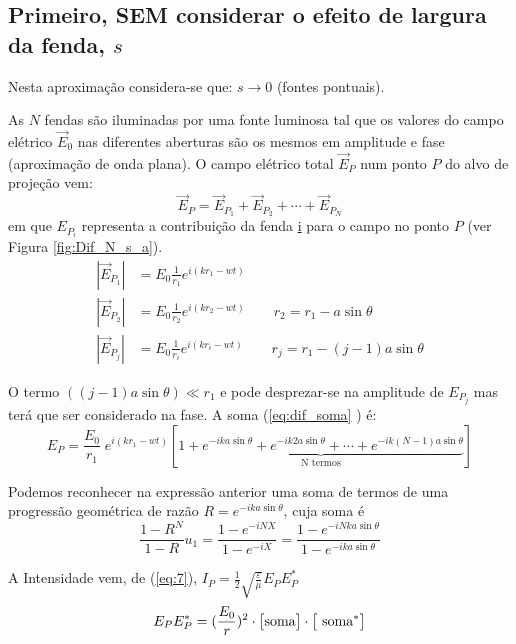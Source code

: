 \documentclass[a4paper,12pt]{article}
\begin{document}
\subsection{Primeiro, SEM considerar o efeito de largura da fenda, $s$}

Nesta aproximação considera-se que: $s\to 0$ (fontes pontuais).
 
As $N$ fendas são iluminadas por uma fonte luminosa tal que os valores do campo elétrico $\vec{E}_0$ nas diferentes aberturas são os mesmos em amplitude e fase (aproximação de onda plana). O campo elétrico total $\vec{E}_P$ num ponto $P$ do alvo de projeção vem:   
\begin{equation}
	\label{eq:dif_soma} \vec{E}_P = \vec{E}_{P_1} + \vec{E}_{P_2} +\cdots +\vec{E}_{P_N} 
\end{equation}
em que $E_{P_i}$ representa a contribuição da fenda \underline{i} para o campo no ponto $P$ (ver Figura \ref{fig:Dif_N_s_a}). 
\begin{align}
	\label{eq:38} |\vec{E}_{P_1}| &= E_0 \frac{1}{r_1} e^{i(k r_1 -wt)} \nonumber \\
	|\vec{E}_{P_2}| &= E_0 \frac{1}{r_2} e^{i(k r_2 -wt)} \qquad r_2 = r_1 - a \sin \theta \\
	|\vec{E}_{P_j}| &= E_0 \frac{1}{r_i} e^{i(k r_i -wt)}\qquad r_j = r_1 - (j-1) a \sin \theta \nonumber 
\end{align}

O termo $((j-1) a \sin \theta) \ll r_1$ e pode desprezar-se na amplitude de $E_{P_j}$ mas terá que ser considerado na fase. A soma (\ref{eq:dif_soma} ) é: 
\begin{equation}
	\label{eq:39} E_{P} = \frac{E_0}{r_1} \; e^{i(k r_1 -wt)} \left[ \underbrace{1 + e^{-i k a \sin \theta} + e^{-i k 2 a \sin \theta} + \cdots + e^{-i k (N-1) a \sin \theta}}_{\text{N termos} }\right]
\end{equation}

Podemos reconhecer na expressão anterior uma soma de termos de uma progressão geométrica de razão $R = e^{-i k a \sin \theta}$, cuja soma 
é 
\begin{equation}
	\frac{1-R^N}{1-R} u_1  = \frac{1-e^{-i N X}}{1-e^{-i X}} = \frac{1-e^{-i N k a \sin \theta}}{1-e^{-i k a \sin \theta}} \label{eq:40}
\end{equation}


A Intensidade vem, de (\ref{eq:7}),  $I_P  =\frac{1}{2} \sqrt{\frac{ \varepsilon}{\mu}} E_P E_P^*$ 
\begin{equation}
	E_P E_P^* = (\frac{E_0}{r})^2 \cdot  \big[\text{soma} \big] \cdot \big[\text{ soma}^* \big] \label{eq:41}\\
\end{equation}
\end{document}
